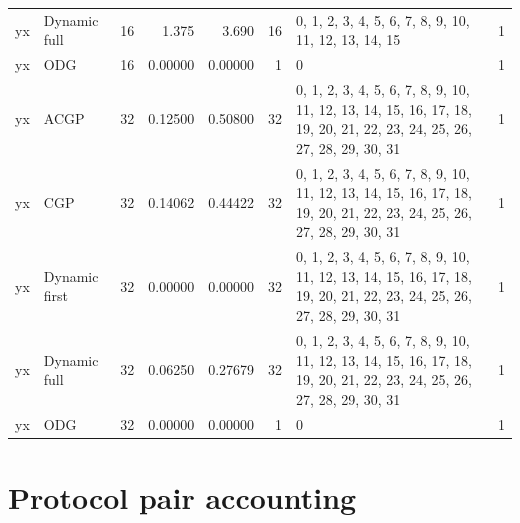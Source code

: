 \documentclass[10pt,a4paper]{article}
\begin{document}
\begin{longtable}{@{}p{23mm}p{29mm}rrrrp{36mm}r@{}}
yx & Dynamic full & 16 & 1.375 & 3.690 & 16 & 0, 1, 2, 3, 4, 5, 6, 7, 8, 9, 10, 11, 12, 13, 14, 15 & 1 \\
yx & ODG & 16 & 0.00000 & 0.00000 & 1 & 0 & 1 \\
yx & ACGP & 32 & 0.12500 & 0.50800 & 32 & 0, 1, 2, 3, 4, 5, 6, 7, 8, 9, 10, 11, 12, 13, 14, 15, 16, 17, 18, 19, 20, 21, 22, 23, 24, 25, 26, 27, 28, 29, 30, 31 & 1 \\
yx & CGP & 32 & 0.14062 & 0.44422 & 32 & 0, 1, 2, 3, 4, 5, 6, 7, 8, 9, 10, 11, 12, 13, 14, 15, 16, 17, 18, 19, 20, 21, 22, 23, 24, 25, 26, 27, 28, 29, 30, 31 & 1 \\
yx & Dynamic first & 32 & 0.00000 & 0.00000 & 32 & 0, 1, 2, 3, 4, 5, 6, 7, 8, 9, 10, 11, 12, 13, 14, 15, 16, 17, 18, 19, 20, 21, 22, 23, 24, 25, 26, 27, 28, 29, 30, 31 & 1 \\
yx & Dynamic full & 32 & 0.06250 & 0.27679 & 32 & 0, 1, 2, 3, 4, 5, 6, 7, 8, 9, 10, 11, 12, 13, 14, 15, 16, 17, 18, 19, 20, 21, 22, 23, 24, 25, 26, 27, 28, 29, 30, 31 & 1 \\
yx & ODG & 32 & 0.00000 & 0.00000 & 1 & 0 & 1 \\
\end{longtable}\normalsize\setlength{\tabcolsep}{6pt}
\clearpage
\section*{Protocol pair accounting}
\clearpage
\end{document}
